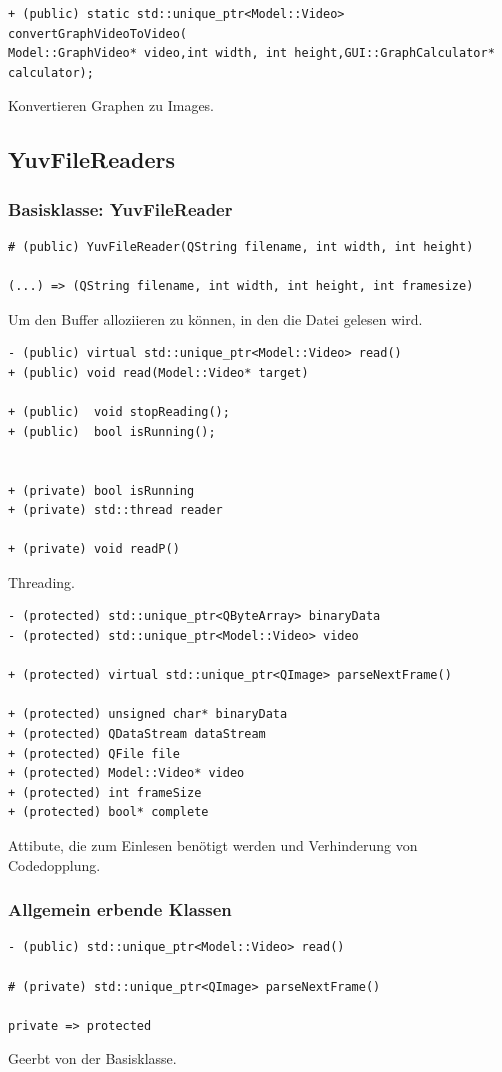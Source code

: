 \documentclass{scrartcl}
\begin{document}
{\begin{verbatim}
+ (public) static std::unique_ptr<Model::Video> convertGraphVideoToVideo(
Model::GraphVideo* video,int width, int height,GUI::GraphCalculator* calculator);
\end{verbatim}
Konvertieren Graphen zu Images.
\newpage
\subsection{YuvFileReaders}
\subsubsection{Basisklasse: YuvFileReader}
\bigskip
\begin{verbatim}
# (public) YuvFileReader(QString filename, int width, int height)

(...) => (QString filename, int width, int height, int framesize)
\end{verbatim}
Um den Buffer alloziieren zu können, in den die Datei gelesen wird.
\bigskip
\begin{verbatim}
- (public) virtual std::unique_ptr<Model::Video> read()
+ (public) void read(Model::Video* target)

+ (public)	void stopReading();
+ (public)	bool isRunning();
	
	
+ (private) bool isRunning
+ (private) std::thread reader

+ (private) void readP()
\end{verbatim}
Threading.
\begin{verbatim}
- (protected) std::unique_ptr<QByteArray> binaryData
- (protected) std::unique_ptr<Model::Video> video

+ (protected) virtual std::unique_ptr<QImage> parseNextFrame()

+ (protected) unsigned char* binaryData
+ (protected) QDataStream dataStream
+ (protected) QFile file
+ (protected) Model::Video* video
+ (protected) int frameSize
+ (protected) bool* complete
\end{verbatim}
Attibute, die zum Einlesen benötigt werden und Verhinderung von Codedopplung.
\bigskip
\subsubsection{Allgemein erbende Klassen}
\begin{verbatim}
- (public) std::unique_ptr<Model::Video> read()

# (private) std::unique_ptr<QImage> parseNextFrame()

private => protected
\end{verbatim}
Geerbt von der Basisklasse.
\newpage
}
\end{document}
